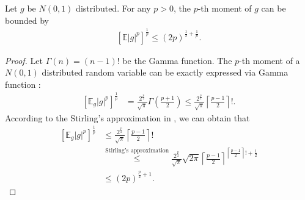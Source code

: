 \documentclass[10pt]{llncs}
\begin{document}
\begin{lemma}
  \label{lemma-3e}
  Let $g$ be $N(0,1)$ distributed. For any $p>0$, the $p$-th moment of $g$ can be bounded by
  \begin{align}
  \label{Eqp}
    \left[\mathbb{E}|g|^p\right]^{\frac{1}{p}}\leq (2p)^{\frac{1}{2}+\frac{1}{p}}.
  \end{align}
\end{lemma}
\begin{proof}
  Let $\Gamma(n)=(n-1)!$ be the Gamma function.
  The $p$-th moment of a $N(0,1)$ distributed random variable can be exactly expressed via Gamma function \cite{winkelbauer2012moments}:
  \begin{align*}
    \left[\mathbb{E}_{g}|g|^{p}\right]^{\frac{1}{p}}&=\frac{2^{\frac{p}{2}}}{\sqrt{\pi}}\Gamma\left(\frac{p+1}{2}\right)
    \leq \frac{2^{\frac{p}{2}}}{\sqrt{\pi}}\left\lceil\frac{p-1}{2}\right\rceil!.
  \end{align*}
  According to the Stirling's approximation in \cite{robbins1955remark},
  we can obtain that
  \begin{align*}
    \left[\mathbb{E}_{g}|g|^{p}\right]^{\frac{1}{p}}
    &\leq \frac{2^{\frac{p}{2}}}{\sqrt{\pi}}\left\lceil\frac{p-1}{2}\right\rceil!\\
    &\overset{\text{Stirling's approximation}}{\leq} \frac{2^{\frac{p}{2}}}{\sqrt{\pi}}\sqrt{2\pi}\left\lceil\frac{p-1}{2}\right\rceil^{\left\lceil\frac{p-1}{2}\right\rceil!+\frac{1}{2}}\\
    &\leq (2p)^{\frac{p}{2}+1}.
  \end{align*}
\end{proof}
\end{document}
